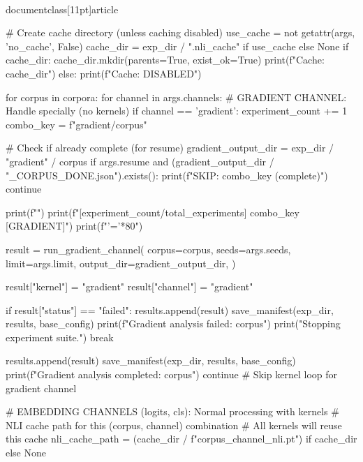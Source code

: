 \\documentclass[11pt]{article}
\begin{document}
\begin{CodeBlock}
    # Create cache directory (unless caching disabled)
    use_cache = not getattr(args, 'no_cache', False)
    cache_dir = exp_dir / ".nli_cache" if use_cache else None
    if cache_dir:
        cache_dir.mkdir(parents=True, exist_ok=True)
        print(f"\nNLI Cache: {cache_dir}")
    else:
        print(f"\nNLI Cache: DISABLED")

    for corpus in corpora:
        for channel in args.channels:
            # GRADIENT CHANNEL: Handle specially (no kernels)
            if channel == 'gradient':
                experiment_count += 1
                combo_key = f"gradient/{corpus}"

                # Check if already complete (for resume)
                gradient_output_dir = exp_dir / "gradient" / corpus
                if args.resume and (gradient_output_dir / "_CORPUS_DONE.json").exists():
                    print(f" SKIP: {combo_key} (complete)")
                    continue

                print(f"")
                print(f"[{experiment_count}/{total_experiments}] {combo_key} [GRADIENT]")
                print(f"{'='*80}")

                result = run_gradient_channel(
                    corpus=corpus,
                    seeds=args.seeds,
                    limit=args.limit,
                    output_dir=gradient_output_dir,
                )

                result["kernel"] = "gradient"
                result["channel"] = "gradient"

                if result["status"] == "failed":
                    results.append(result)
                    save_manifest(exp_dir, results, base_config)
                    print(f"\n Gradient analysis failed: {corpus}")
                    print("Stopping experiment suite.")
                    break

                results.append(result)
                save_manifest(exp_dir, results, base_config)
                print(f"\n Gradient analysis completed: {corpus}")
                continue  # Skip kernel loop for gradient channel

            # EMBEDDING CHANNELS (logits, cls): Normal processing with kernels
            # NLI cache path for this (corpus, channel) combination
            # All kernels will reuse this cache
            nli_cache_path = (cache_dir / f"{corpus}_{channel}_nli.pt") if cache_dir else None


\end{CodeBlock}
\end{document}
